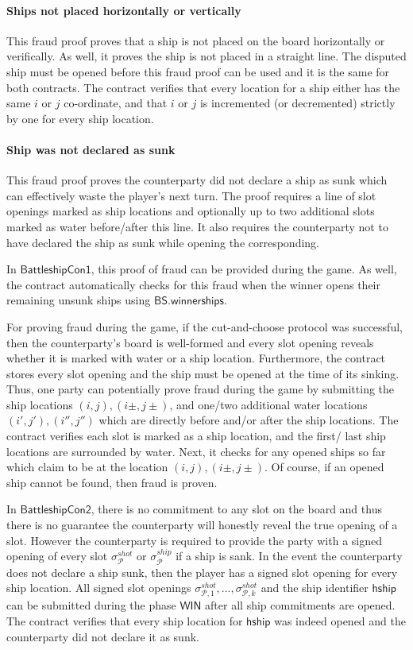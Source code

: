 \documentclass{llncs}
\newcommand{\gamewinner}{\mathsf{WIN}}
\newcommand{\hship}{\mathsf{hship}}
\newcommand{\participant}{\mathcal{P}}
\newcommand{\battleshiprevealships}{\mathsf{BS.winnerships}}
\begin{document}
\paragraph{Ships not placed horizontally or vertically} 
This fraud proof proves that a ship is not placed on the board horizontally or verifically.
As well, it proves the ship is not placed in a straight line. 
The disputed ship must be opened before this fraud proof can be used and it is the same for both contracts.
The contract verifies that every location for a ship either has the same $i$ or $j$ co-ordinate, and that $i$ or $j$ is incremented (or decremented) strictly by one for every ship location. 

\paragraph{Ship was not declared as sunk}
This fraud proof proves the counterparty did not declare a ship as sunk which can effectively waste the player's next turn. 
The proof requires a line of slot openings marked as ship locations and optionally  up to two additional slots marked as water before/after this line. 
It also requires the counterparty not to have declared the ship as sunk while opening the corresponding. 

In $\mathsf{BattleshipCon1}$, this proof of fraud can be provided during the game. 
As well, the contract automatically checks for this fraud when the winner opens their remaining unsunk ships using $\battleshiprevealships$. 

For proving fraud during the game, if the cut-and-choose protocol was successful, then the counterparty's board is well-formed and every slot opening reveals whether it is marked with water or a ship location. 
Furthermore, the contract stores every slot opening and the ship must be opened at the time of its sinking. 
Thus, one party can potentially prove fraud during the game by submitting the ship locations $(i,j),(i\pm,j\pm)$, and one/two additional water locations $(i',j'),(i'',j'')$ which are directly before and/or after the ship locations. 
The contract verifies each slot is marked as a ship location, and the first/ last ship locations are surrounded by water. 
Next, it checks for any opened ships so far which claim to be at the location $(i,j),(i\pm,j\pm)$. 
Of course, if an opened ship cannot be found, then fraud is proven.

In $\mathsf{BattleshipCon2}$, there is no commitment to any slot on the board and thus there is no guarantee the counterparty will honestly reveal the true opening of a slot. 
However the counterparty is required to provide the party with a signed opening of every slot $\sigma^{shot}_{\participant}$ or $\sigma^{ship}_{\participant}$ if a ship is sank. 
In the event the counterparty does not declare a ship sunk, then the player has a signed slot opening for every ship location. 
All signed slot openings $\sigma^{shot}_{\participant,1},...,\sigma^{shot}_{\participant,k}$ and the ship identifier $\hship$ can be submitted during the phase $\gamewinner$ after all ship commitments are opened.
The contract verifies that every ship location for $\hship$ was indeed opened and the counterparty did not declare it as sunk. 
\end{document}
